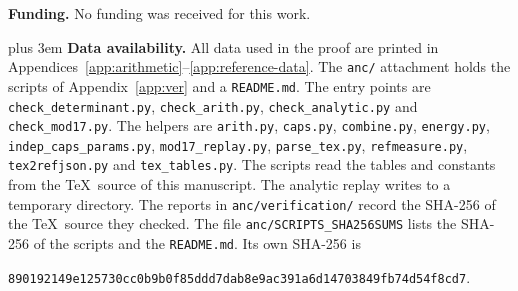 \documentclass{amsart}
\numberwithin{equation}{section}
\numberwithin{table}{section}
\begin{document}
\textbf{Funding.} No funding was received for this work.

{\rightskip=0pt plus 3em\relax
\textbf{Data availability.} All data used in the proof are printed in
Appendices~\ref{app:arithmetic}--\ref{app:reference-data}. The \texttt{anc/}
attachment holds the scripts of Appendix~\ref{app:ver} and a
\texttt{README.md}. The entry points are \texttt{check\_determinant.py},
\texttt{check\_arith.py}, \texttt{check\_analytic.py} and
\texttt{check\_mod17.py}. The helpers are \texttt{arith.py}, \texttt{caps.py},
\texttt{combine.py}, \texttt{energy.py}, \texttt{indep\_caps\_params.py},
\texttt{mod17\_replay.py}, \texttt{parse\_tex.py}, \texttt{refmeasure.py},
\texttt{tex2refjson.py} and \texttt{tex\_tables.py}. The scripts read the
tables and constants from the \TeX\ source of this manuscript. The analytic
replay writes to a temporary directory. The reports in
\texttt{anc/verification/} record the SHA-256 of the \TeX\ source they
checked. The file \texttt{anc/SCRIPTS\_SHA256SUMS} lists the SHA-256 of the
scripts and the \texttt{README.md}. Its own SHA-256 is\par}
\begin{center}\small
\texttt{890192149e125730cc0b9b0f85ddd7dab8e9ac391a6d14703849fb74d54f8cd7}.
\end{center}
\end{document}
